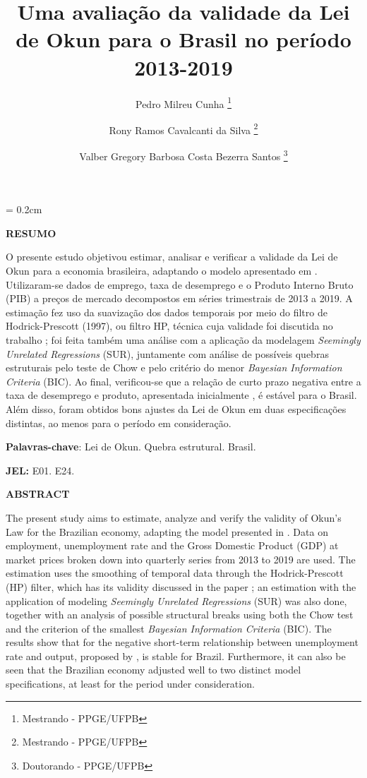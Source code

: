 \documentclass[12pt, openright,oneside, a4paper, english, brazil, section = TITLE, ubsection = Title]{article}
\title{Uma avaliação da validade da Lei de Okun para o Brasil no período 2013-2019}
\author{Pedro Milreu Cunha \thanks{Mestrando - PPGE/UFPB} \and 
Rony Ramos Cavalcanti da Silva \thanks{Mestrando - PPGE/UFPB} \and 
Valber Gregory Barbosa Costa Bezerra Santos \thanks{Doutorando - PPGE/UFPB}}
\date{}
\begin{document}
\topmargin = 0.2cm
\maketitle

\setlength{\parindent}{0cm}



\textbf{RESUMO} 

O presente estudo objetivou estimar, analisar e verificar a validade da Lei de Okun para a economia brasileira, adaptando o modelo apresentado em . Utilizaram-se dados de emprego, taxa de desemprego e o Produto Interno Bruto (PIB) a preços de mercado decompostos em séries trimestrais de 2013 a 2019.  A estimação fez uso da suavização dos dados temporais por meio do filtro de Hodrick-Prescott (1997), ou filtro HP, técnica cuja validade foi discutida no trabalho \cite{Hodrick1997}; foi feita também uma análise com a aplicação da modelagem \textit{Seemingly Unrelated Regressions} (SUR), juntamente com análise de possíveis quebras estruturais pelo teste de Chow e pelo critério do menor \textit{Bayesian Information Criteria} (BIC). Ao final, verificou-se que a relação de curto prazo negativa entre a taxa de desemprego e produto, apresentada inicialmente , é estável para o Brasil. Além disso, foram obtidos bons ajustes da Lei de Okun em duas especificações distintas, ao menos para o período em consideração.

\textbf{Palavras-chave}: Lei de Okun. Quebra estrutural. Brasil.

\textbf{JEL:}  E01. E24.

\vspace{0.6cm}

\textbf{ABSTRACT} 

The present study aims to estimate, analyze and verify the validity of Okun's Law for the Brazilian economy, adapting the model presented in . Data on employment, unemployment rate and the Gross Domestic Product (GDP) at market prices broken down into quarterly series from 2013 to 2019 are used. The estimation uses the smoothing of temporal data through the Hodrick-Prescott (HP) filter, which has its validity discussed in the paper \cite{Hodrick1997}; an estimation with the application of modeling \textit{Seemingly Unrelated Regressions} (SUR) was also done, together with an analysis of possible structural breaks using both the Chow test and the criterion of the smallest \textit{Bayesian Information Criteria} (BIC). The results show that for the negative short-term relationship between unemployment rate and output, proposed by , is stable for Brazil. Furthermore, it can also be seen that the Brazilian economy adjusted well to two distinct model specifications, at least for the period under consideration.
\end{document}
